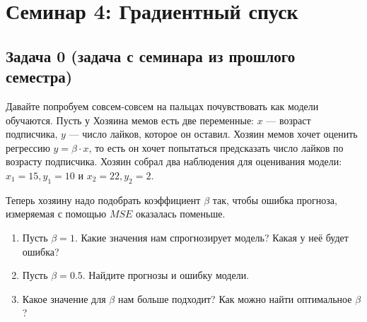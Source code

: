 \documentclass[12pt, a4paper, oneside]{article}
\begin{document}
	
\section*{Семинар 4: Градиентный спуск}

\subsection*{Задача 0 (задача с семинара из прошлого семестра)}

Давайте попробуем совсем-совсем на пальцах почувствовать как модели обучаются. Пусть у Хозяина мемов есть две переменные: $x$ --- возраст подписчика, $y$ --- число лайков, которое он оставил. Хозяин мемов хочет оценить регрессию $y = \beta \cdot x$, то есть он хочет попытаться предсказать число лайков по возрасту подписчика. Хозяин собрал два наблюдения для оценивания модели: $x_1 = 15, y_1 = 10$ и $x_2 = 22, y_2 = 2$.

Теперь хозяину надо подобрать коэффициент $\beta$ так, чтобы ошибка прогноза, измеряемая с помощью $MSE$ оказалась поменьше. 

\begin{enumerate} 
	\item  Пусть $\beta = 1$. Какие значения нам спрогнозирует модель? Какая у неё будет ошибка? 
	
	\item Пусть $\beta = 0.5$. Найдите прогнозы и ошибку модели. 
	
	\item  Какое значение для $\beta$ нам больше подходит? Как можно найти оптимальное $\beta$? 
\end{enumerate}  

\end{document}
